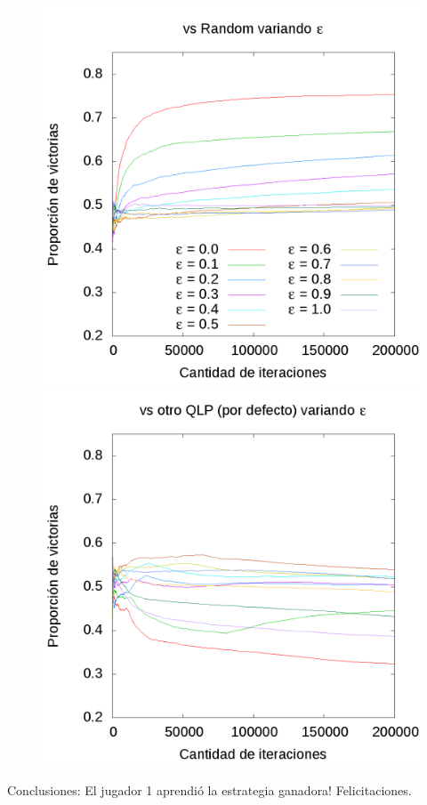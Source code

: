 \documentclass[10pt, a4paper]{article}
\begin{document}
\begin{figure}[ht]
  \begin{minipage}[c]{1\textwidth}
	\includegraphics[scale=0.32]{EpsilonR.png}
	\includegraphics[scale=0.32]{EpsilonQ.png}
  \end{minipage}
\end{figure}

\restoregeometry

Conclusiones: El jugador 1 aprendió la estrategia ganadora! Felicitaciones.
\end{document}
